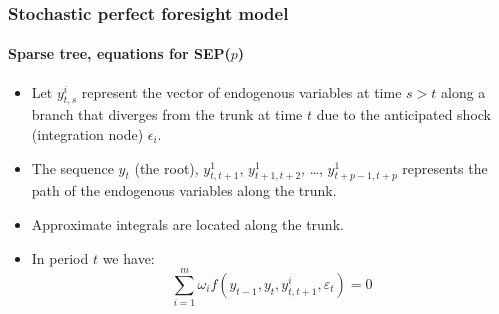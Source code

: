 \documentclass{beamer}
\begin{document}
\begin{frame}
   \frametitle{Stochastic perfect foresight model}
   \framesubtitle{Sparse tree, equations for SEP($p$)}

   \begin{itemize}

      \item Let $y_{t,s}^i$ represent the vector of endogenous variables
            at time $s>t$ along a branch that diverges from the trunk at
            time $t$ due to the anticipated shock (integration
            node) $\epsilon_i$.\newline

      \item The sequence $y_t$ (the
            root), $y_{t,t+1}^1$, $y_{t+1,t+2}^1$,
            \dots, $y_{t+p-1,t+p}^1$ represents the path of the
            endogenous variables along the trunk.\newline

      \item Approximate integrals are located along the trunk.\newline

      \item In period $t$ we have:
            \[
               \sum_{i=1}^m\omega_i f\left( y_{t-1}, y_t, y_{t, t+1}^i, \varepsilon_t \right) = 0
            \]

   \end{itemize}

\end{frame}
\end{document}
